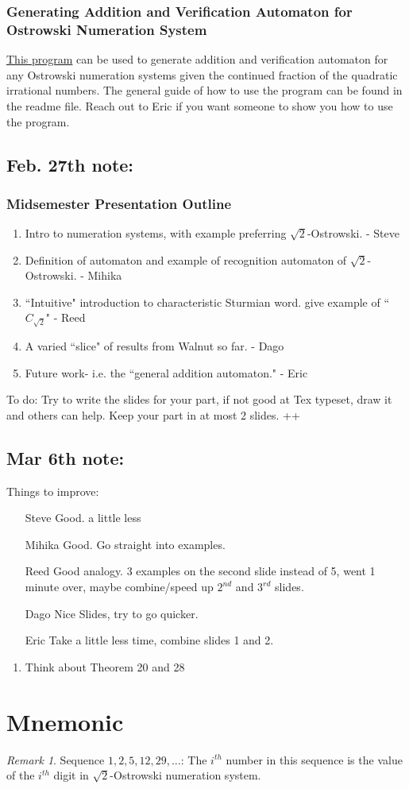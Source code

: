\documentclass{article}
\theoremstyle{definition}
\theoremstyle{remark}
\newtheorem{remark}[definition]{Remark}
\theoremstyle{remark}
\theoremstyle{plain}
\theoremstyle{definition}
\begin{document}
\subsubsection{Generating Addition and Verification Automaton for Ostrowski Numeration System}
\href{https://gitlab.engr.illinois.edu/2018IGL-automata/general-ostrowski-addition-automaton-java}{This program} can be used to generate addition and verification automaton for any Ostrowski numeration systems given the continued fraction of the quadratic irrational numbers. 
The general guide of how to use the program can be found in the readme file. Reach out to Eric if you want someone to show you how to use the program. 


\subsection{Feb. 27th note:}
\subsubsection{Midsemester Presentation Outline}
\begin{enumerate}
    \item Intro to numeration systems, with example preferring $\sqrt{2}$-Ostrowski. - Steve
    \item Definition of automaton and example of recognition automaton of $\sqrt{2}$-Ostrowski. - Mihika
    \item ``Intuitive" introduction to characteristic Sturmian word. give example of ``$C_{\sqrt{2}}$" - Reed
    \item A varied ``slice" of results from Walnut so far. - Dago
    \item Future work- i.e. the ``general addition automaton." - Eric
\end{enumerate}
To do: Try to write the slides for your part, if not good at Tex typeset, draw it and others can help. Keep your part in at most 2 slides. ++
\subsection{Mar 6th note:}
Things to improve:
\begin{enumerate}
    \item [Steve] Good. a little less
    \item [Mihika] Good. Go straight into examples.
    \item [Reed] Good analogy. 3 examples on the second slide instead of 5, went 1 minute over, maybe combine/speed up $2^{nd}$ and $3^{rd}$ slides.
    \item [Dago] Nice Slides, try to go quicker. 
    \item [Eric] Take a little less time, combine slides 1 and 2.
\end{enumerate}

\begin{enumerate}
    \item Think about Theorem 20 and 28
\end{enumerate}

\section{Mnemonic}
\begin{remark}
Sequence $1, 2, 5, 12, 29, \dots$: The $i^{th}$ number in this sequence is the value of the $i^{th}$ digit in $\sqrt{2}$-Ostrowski numeration system.
\end{remark}
\end{document}
